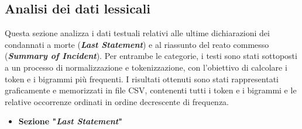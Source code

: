 \documentclass[11pt]{article}
\begin{document}
\subsection{Analisi dei dati lessicali}
Questa sezione analizza i dati testuali relativi alle ultime dichiarazioni dei condannati a morte (\textbf{\textit{Last Statement}}) e al riassunto del reato commesso (\textbf{\textit{Summary of Incident}}). Per entrambe le categorie, i testi sono stati sottoposti a un processo di normalizzazione e tokenizzazione, con l’obiettivo di calcolare i token e i bigrammi più frequenti. I risultati ottenuti sono stati rappresentati graficamente e memorizzati in file CSV, contenenti tutti i token e i bigrammi e le relative occorrenze ordinati in ordine decrescente di frequenza.

\begin{itemize}
    \item \textbf{Sezione "\textit{Last Statement}"}
    

\end{itemize}
\end{document}
